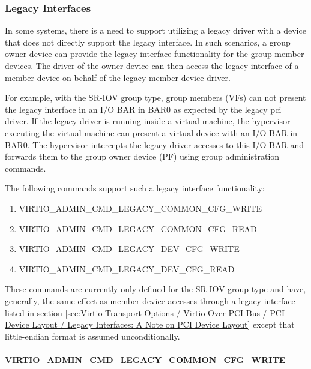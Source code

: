 \subsubsection{Legacy Interfaces}\label{sec:Basic Facilities of a Virtio Device / Device groups / Group
administration commands / Legacy Interface}

In some systems, there is a need to support utilizing a legacy driver with
a device that does not directly support the legacy interface. In such scenarios,
a group owner device can provide the legacy interface functionality for the
group member devices. The driver of the owner device can then access the legacy
interface of a member device on behalf of the legacy member device driver.

For example, with the SR-IOV group type, group members (VFs) can not present
the legacy interface in an I/O BAR in BAR0 as expected by the legacy pci driver.
If the legacy driver is running inside a virtual machine, the hypervisor
executing the virtual machine can present a virtual device with an I/O BAR in
BAR0. The hypervisor intercepts the legacy driver accesses to this I/O BAR and
forwards them to the group owner device (PF) using group administration commands.

The following commands support such a legacy interface functionality:

\begin{enumerate}
\item VIRTIO_ADMIN_CMD_LEGACY_COMMON_CFG_WRITE
\item VIRTIO_ADMIN_CMD_LEGACY_COMMON_CFG_READ
\item VIRTIO_ADMIN_CMD_LEGACY_DEV_CFG_WRITE
\item VIRTIO_ADMIN_CMD_LEGACY_DEV_CFG_READ
\end{enumerate}

These commands are currently only defined for the SR-IOV group type and
have, generally, the same effect as member device accesses through a legacy
interface listed in section \ref{sec:Virtio Transport Options / Virtio Over PCI
Bus / PCI Device Layout / Legacy Interfaces: A Note on PCI Device Layout} except
that little-endian format is assumed unconditionally.

\paragraph{VIRTIO_ADMIN_CMD_LEGACY_COMMON_CFG_WRITE}
\label{par:Basic Facilities of a Virtio Device / Device groups / Group administration commands / Legacy Interface / VIRTIO_ADMIN_CMD_LEGACY_COMMON_CFG_WRITE}


